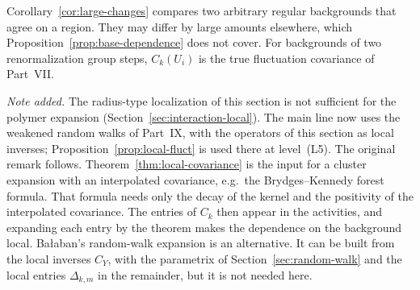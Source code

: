 Corollary~\ref{cor:large-changes} compares two arbitrary regular backgrounds that agree on a region. They may differ by large amounts elsewhere, which Proposition~\ref{prop:base-dependence} does not cover. For backgrounds of two renormalization group steps, $C_k(U_i)$ is the true fluctuation covariance of Part~VII.

\begin{remark}
\emph{Note added.} The radius-type localization of this section is not sufficient for the polymer expansion (Section~\ref{sec:interaction-local}). The main line now uses the weakened random walks of Part~IX, with the operators of this section as local inverses; Proposition~\ref{prop:local-fluct} is used there at level~(L5). The original remark follows. Theorem~\ref{thm:local-covariance} is the input for a cluster expansion with an interpolated covariance, e.g.\ the Brydges--Kennedy forest formula. That formula needs only the decay of the kernel and the positivity of the interpolated covariance. The entries of $C_k$ then appear in the activities, and expanding each entry by the theorem makes the dependence on the background local. Ba\l aban's random-walk expansion \cite{BalBackground} is an alternative. It can be built from the local inverses $C_Y$, with the parametrix of Section~\ref{sec:random-walk} and the local entries $\Delta_{k,m}$ in the remainder, but it is not needed here.
\end{remark}
